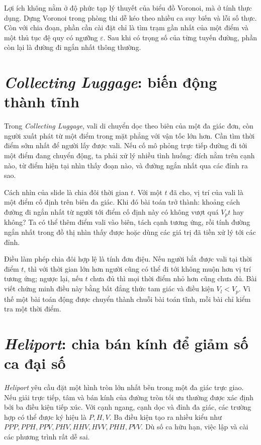 \documentclass[11pt]{article}
\begin{document}
Lợi ích không nằm ở độ phức tạp lý thuyết của biểu đồ Voronoi, mà ở tính thực
dụng. Dựng Voronoi trong phòng thi dễ kéo theo nhiều ca suy biến và lỗi số
thực. Còn với chia đoạn, phần cần cài đặt chỉ là tìm trạm gần nhất của một
điểm và một thủ tục đệ quy có ngưỡng \(\varepsilon\). Sau khi có trọng số của
từng tuyến đường, phần còn lại là đường đi ngắn nhất thông thường.

\section{\textit{Collecting Luggage}: biến động thành tĩnh}

Trong \textit{Collecting Luggage}, vali di chuyển dọc theo biên của một đa
giác đơn, còn người xuất phát từ một điểm trong mặt phẳng với vận tốc lớn hơn.
Cần tìm thời điểm sớm nhất để người lấy được vali. Nếu cố mô phỏng trực tiếp
đường đi tới một điểm đang chuyển động, ta phải xử lý nhiều tình huống: đích
nằm trên cạnh nào, từ điểm hiện tại nhìn thấy đoạn nào, và đường ngắn nhất
qua các đỉnh ra sao.

Cách nhìn của slide là chia đôi thời gian \(t\). Với một \(t\) đã cho, vị trí
của vali là một điểm cố định trên biên đa giác. Khi đó bài toán trở thành:
khoảng cách đường đi ngắn nhất từ người tới điểm cố định này có không vượt
quá \(V_p t\) hay không? Ta có thể thêm điểm vali vào biên, tách cạnh tương
ứng, rồi tính đường ngắn nhất trong đồ thị nhìn thấy được hoặc dùng các giá
trị đã tiền xử lý tới các đỉnh.

Điều làm phép chia đôi hợp lệ là tính đơn điệu. Nếu người bắt được vali tại
thời điểm \(t\), thì với thời gian lớn hơn người cũng có thể đi tới không
muộn hơn vị trí tương ứng; ngược lại, nếu \(t\) chưa đủ thì mọi thời điểm nhỏ
hơn cũng chưa đủ. Bài viết chứng minh điều này bằng bất đẳng thức tam giác và
điều kiện \(V_l<V_p\). Vì thế một bài toán động được chuyển thành chuỗi bài
toán tĩnh, mỗi bài chỉ kiểm tra một thời điểm.

\section{\textit{Heliport}: chia bán kính để giảm số ca đại số}

\textit{Heliport} yêu cầu đặt một hình tròn lớn nhất bên trong một đa giác
trực giao. Nếu giải trực tiếp, tâm và bán kính của đường tròn tối ưu thường
được xác định bởi ba điều kiện tiếp xúc. Với cạnh ngang, cạnh dọc và đỉnh
đa giác, các trường hợp có thể được ký hiệu là \(P,H,V\). Ba điều kiện tạo ra
nhiều kiểu như \(PPP, PPH, PPV, PHV, HHV, HVV, PHH, PVV\). Dù số ca hữu hạn,
việc lập và cài các phương trình rất dễ sai.
\end{document}
